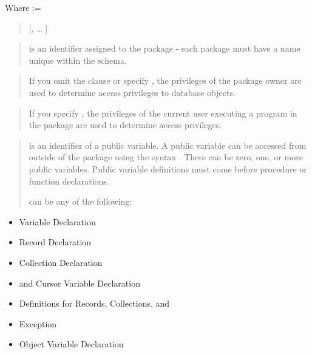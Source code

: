 \documentclass[letterpaper,10pt,english,openany,oneside]{sphinxmanual}
\begin{document}
Where  :=
\begin{quote}

 {[}, … {]}
\end{quote}


\begin{quote}

 is an identifier assigned to the package - each
package must have a name unique within the schema.
\end{quote}

\begin{quote}

If you omit the  clause or specify , the
privileges of the package owner are used to determine access
privileges to database objects.
\end{quote}

\begin{quote}

If you specify , the privileges of the current
user executing a program in the package are used to determine access
privileges.
\end{quote}

\begin{quote}

 is an identifier of a public variable. A public
variable can be accessed from outside of the package using the
syntax . There can be zero, one, or more
public variables. Public variable definitions must come before
procedure or function declarations.

 can be any of the following:
\end{quote}
\begin{itemize}
\item {} 
Variable Declaration

\item {} 
Record Declaration

\item {} 
Collection Declaration

\item {} 
 and Cursor Variable Declaration

\item {} 
 Definitions for Records, Collections, and 

\item {} 
Exception

\item {} 
Object Variable Declaration

\end{itemize}
\end{document}
